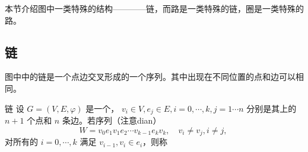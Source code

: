 
本节介绍图中一类特殊的结构————链，而路是一类特殊的链，圈是一类特殊的路。

\subsection{链}
图中中的链是一个点边交叉形成的一个序列。其中出现在不同位置的点和边可以相同。

\begin{definition}{链}
设 $G=(V,E,\varphi)$ 是一个， $v_i\in V,e_j\in E,i=0,\cdots,k,j=1\cdots n$ 分别是其上的 $n+1$ 个点和 $n$ 条边。若序列（注意dian）
\begin{equation}
W=v_0 e_1v_1e_2\cdots v_{k-1} e_kv_k,\quad v_i\neq v_j,i\neq j,~
\end{equation}
对所有的 $i=0,\cdots,k$ 满足 $v_{i-1},v_{i}\in e_{i}$，则称 
\end{definition}














